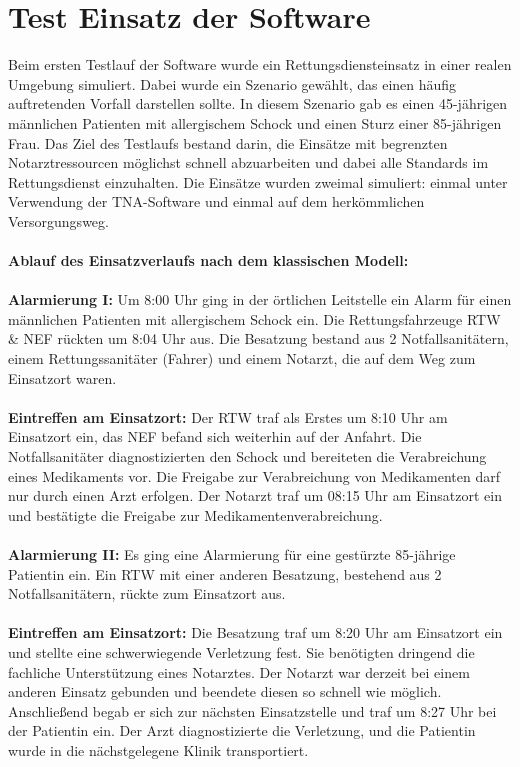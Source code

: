 \section{Test Einsatz der Software}

Beim ersten Testlauf der Software wurde ein Rettungsdiensteinsatz in einer realen Umgebung simuliert. Dabei wurde ein Szenario gewählt, das einen häufig auftretenden Vorfall darstellen sollte. In diesem Szenario gab es einen 45-jährigen männlichen Patienten mit allergischem Schock und einen Sturz einer 85-jährigen Frau. Das Ziel des Testlaufs bestand darin, die Einsätze mit begrenzten Notarztressourcen möglichst schnell abzuarbeiten und dabei alle Standards im Rettungsdienst einzuhalten. Die Einsätze wurden zweimal simuliert: einmal unter Verwendung der TNA-Software und einmal auf dem herkömmlichen Versorgungsweg.
\\\\
\textbf{Ablauf des Einsatzverlaufs nach dem klassischen Modell:}
\\\\
\textbf{Alarmierung I:}
Um 8:00 Uhr ging in der örtlichen Leitstelle ein Alarm für einen männlichen Patienten mit allergischem Schock ein. Die Rettungsfahrzeuge RTW \& NEF rückten um 8:04 Uhr aus. Die Besatzung bestand aus 2 Notfallsanitätern, einem Rettungssanitäter (Fahrer) und einem Notarzt, die auf dem Weg zum Einsatzort waren.
\\\\
\textbf{Eintreffen am Einsatzort:}
Der RTW traf als Erstes um 8:10 Uhr am Einsatzort ein, das NEF befand sich weiterhin auf der Anfahrt. Die Notfallsanitäter diagnostizierten den Schock und bereiteten die Verabreichung eines Medikaments vor. Die Freigabe zur Verabreichung von Medikamenten darf nur durch einen Arzt erfolgen.
Der Notarzt traf um 08:15 Uhr am Einsatzort ein und bestätigte die Freigabe zur Medikamentenverabreichung.
\\\\
\textbf{Alarmierung II:}
Es ging eine Alarmierung für eine gestürzte 85-jährige Patientin ein. Ein RTW mit einer anderen Besatzung, bestehend aus 2 Notfallsanitätern, rückte zum Einsatzort aus.
\\\\
\textbf{Eintreffen am Einsatzort:}
Die Besatzung traf um 8:20 Uhr am Einsatzort ein und stellte eine schwerwiegende Verletzung fest. Sie benötigten dringend die fachliche Unterstützung eines Notarztes.
Der Notarzt war derzeit bei einem anderen Einsatz gebunden und beendete diesen so schnell wie möglich. Anschließend begab er sich zur nächsten Einsatzstelle und traf um 8:27 Uhr bei der Patientin ein. Der Arzt diagnostizierte die Verletzung, und die Patientin wurde in die nächstgelegene Klinik transportiert.

